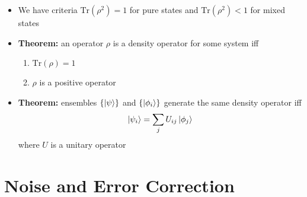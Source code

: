 \documentclass[12pt,a4paper]{article}
\numberwithin{equation}{section}
\begin{document}
\begin{itemize}
		\item We have criteria $\text{Tr}(\rho^{2})=1$ for pure states and $\text{Tr}(\rho^{2})<1$ for mixed states
		\item \textbf{Theorem:} an operator $\rho$ is a density operator for some system iff
		\begin{enumerate}
			\item $\text{Tr}(\rho)=1$
			\item $\rho$ is a positive operator
		\end{enumerate}
		\item \textbf{Theorem:} ensembles $\{\ket{\psi}\}$ and $\{\ket{\phi_{i}}\}$ generate the same density operator iff
		$$
			\ket{\psi_{i}}=\sum_{j}U_{ij}\ket{\phi_{j}}
		$$
		where $U$ is a unitary operator
	\end{itemize}
	\section{Noise and Error Correction}
\end{document}
